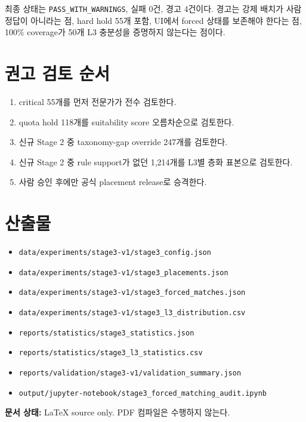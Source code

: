 \documentclass[11pt,a4paper]{article}
\newcommand{\code}[1]{\texttt{#1}}
\begin{document}
최종 상태는 \code{PASS\_WITH\_WARNINGS}, 실패 0건, 경고 4건이다. 경고는
강제 배치가 사람 정답이 아니라는 점, hard hold 55개 포함, UI에서 forced 상태를
보존해야 한다는 점, 100\% coverage가 50개 L3 충분성을 증명하지 않는다는 점이다.

\section{권고 검토 순서}

\begin{enumerate}[leftmargin=2em]
  \item critical 55개를 먼저 전문가가 전수 검토한다.
  \item quota hold 118개를 suitability score 오름차순으로 검토한다.
  \item 신규 Stage 2 중 taxonomy-gap override 247개를 검토한다.
  \item 신규 Stage 2 중 rule support가 없던 1,214개를 L3별 층화 표본으로 검토한다.
  \item 사람 승인 후에만 공식 placement release로 승격한다.
\end{enumerate}

\section*{산출물}

\begin{itemize}[leftmargin=2em]
  \item \nolinkurl{data/experiments/stage3-v1/stage3_config.json}
  \item \nolinkurl{data/experiments/stage3-v1/stage3_placements.json}
  \item \nolinkurl{data/experiments/stage3-v1/stage3_forced_matches.json}
  \item \nolinkurl{data/experiments/stage3-v1/stage3_l3_distribution.csv}
  \item \nolinkurl{reports/statistics/stage3_statistics.json}
  \item \nolinkurl{reports/statistics/stage3_l3_statistics.csv}
  \item \nolinkurl{reports/validation/stage3-v1/validation_summary.json}
  \item \nolinkurl{output/jupyter-notebook/stage3_forced_matching_audit.ipynb}
\end{itemize}

\vfill
\noindent\textbf{문서 상태:} LaTeX source only. PDF 컴파일은 수행하지 않는다.
\end{document}
